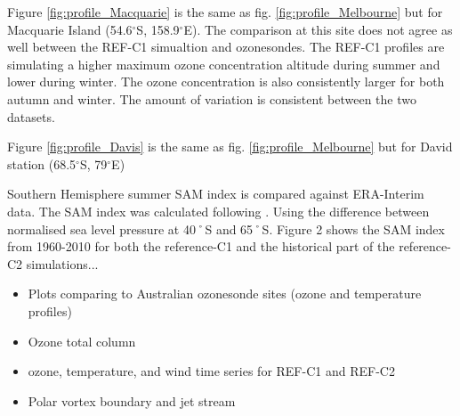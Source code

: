 Figure \ref{fig:profile_Macquarie} is the same as fig. \ref{fig:profile_Melbourne} but for Macquarie Island (54.6$^\circ$S, 158.9$^\circ$E). The comparison at this site does not agree as well between the REF-C1 simualtion and ozonesondes. The REF-C1 profiles are simulating a higher maximum ozone concentration altitude during summer and lower during winter. The ozone concentration is also consistently larger for both autumn and winter. The amount of variation is consistent between the two datasets.

Figure \ref{fig:profile_Davis} is the same as fig. \ref{fig:profile_Melbourne} but for David station (68.5$^\circ$S, 79$^\circ$E)

Southern Hemisphere summer SAM index is compared against ERA-Interim data. The SAM index was calculated following \cite{DaoyiGong:2007vm}. Using the difference between normalised sea level pressure at 40˚S and 65˚S. Figure 2 shows the SAM index from 1960-2010 for both the reference-C1 and the historical part of the reference-C2 simulations...

\begin{itemize}
\item Plots comparing to Australian ozonesonde sites (ozone and temperature profiles)
\item Ozone total column
\item ozone, temperature, and wind time series for REF-C1 and REF-C2
\item Polar vortex boundary and jet stream
\end{itemize}